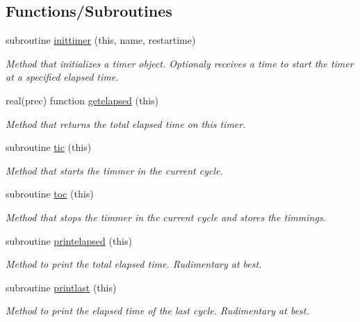 \subsection*{Functions/\+Subroutines}
\begin{DoxyCompactItemize}
\item 
subroutine \mbox{\hyperlink{namespacesimulationtimer__mod_a3e4c0de31b2db7da6c0c781c047a3743}{inittimer}} (this, name, restartime)
\begin{DoxyCompactList}\small\item\em Method that initializes a timer object. Optionaly receives a time to start the timer at a specified elapsed time. \end{DoxyCompactList}\item 
real(prec) function \mbox{\hyperlink{namespacesimulationtimer__mod_a54fa7688c279c747bd76554fb8adb819}{getelapsed}} (this)
\begin{DoxyCompactList}\small\item\em Method that returns the total elapsed time on this timer. \end{DoxyCompactList}\item 
subroutine \mbox{\hyperlink{namespacesimulationtimer__mod_a0924f340c4f5785a5981bdc99226e576}{tic}} (this)
\begin{DoxyCompactList}\small\item\em Method that starts the timmer in the current cycle. \end{DoxyCompactList}\item 
subroutine \mbox{\hyperlink{namespacesimulationtimer__mod_ae5c4ca42de2cd1f446eee79112cedd14}{toc}} (this)
\begin{DoxyCompactList}\small\item\em Method that stops the timmer in the current cycle and stores the timmings. \end{DoxyCompactList}\item 
subroutine \mbox{\hyperlink{namespacesimulationtimer__mod_a9df6f995616d7fa53094178c3aff1fad}{printelapsed}} (this)
\begin{DoxyCompactList}\small\item\em Method to print the total elapsed time. Rudimentary at best. \end{DoxyCompactList}\item 
subroutine \mbox{\hyperlink{namespacesimulationtimer__mod_ae6e0d8f98a24587daf93cedb4e93ad79}{printlast}} (this)
\begin{DoxyCompactList}\small\item\em Method to print the elapsed time of the last cycle. Rudimentary at best. \end{DoxyCompactList}\item 

\end{DoxyCompactItemize}
